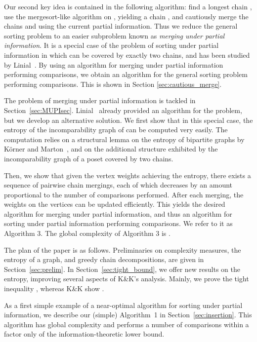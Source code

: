 \documentclass{article} \usepackage{fullpage}
\begin{document}
Our second key idea is contained in the following algorithm: find a longest chain , use the mergesort-like algorithm on , yielding a chain , and cautiously merge the chains  and  using the current partial information. Thus we reduce the general sorting problem to an easier subproblem known as {\sl merging under partial information}. It is a special case of the problem of sorting under partial information in which  can be covered by exactly two chains, and has been studied by Linial~\cite{L84}. By using an algorithm for merging under partial information performing  comparisons, we obtain an algorithm for the general sorting problem performing  comparisons. This is shown in Section \ref{sec:cautious_merge}.

The problem of merging under partial information is tackled in Section~\ref{sec:MUPIsec}. Linial~\cite{L84} already provided an algorithm for the problem, but we develop an alternative solution. We first show that in this special case, the entropy of the incomparability graph of  can be computed very easily. The computation relies on a structural lemma on the entropy of bipartite graphs by K\"orner and Marton~\cite{KM88}, and on the additional structure exhibited by the incomparability graph of a poset covered by two chains.

Then, we show that given the vertex weights achieving the entropy, there exists a sequence of pairwise chain mergings, each of which decreases  by an amount proportional to the number of comparisons performed. After each merging, the weights on the vertices can be updated efficiently. This yields the desired algorithm for merging under partial information, and thus an algorithm for sorting under partial information performing  comparisons. We refer to it as Algorithm 3. The global complexity of Algorithm 3 is .

The plan of the paper is as follows. Preliminaries on complexity measures, the entropy of a graph, and greedy chain decompositions, are given in Section~\ref{sec:prelim}. In Section~\ref{sec:tight_bound}, we offer new results on the entropy, improving several aspects of K\&K's analysis. Mainly, we prove the tight inequality , whereas K\&K show .

As a first simple example of a near-optimal algorithm for sorting under partial information, we describe our (simple) Algorithm~1 in Section~\ref{sec:insertion}. This algorithm has global complexity  and performs a number of comparisons within a  factor only of the information-theoretic lower bound. 
\end{document}
